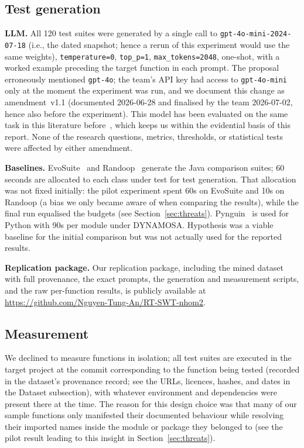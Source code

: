 \subsection{Test generation}
\textbf{LLM.} All 120 test suites were generated by a single call to
\texttt{gpt-4o-mini-2024-07-18} (i.e., the dated snapshot; hence a rerun of this
experiment would use the same weights), \texttt{temperature=0}, \texttt{top\_p=1},
\texttt{max\_tokens=2048}, one-shot, with a worked example preceding the target function
in each prompt. The proposal erroneously mentioned \texttt{gpt-4o}; the team's API key
had access to \texttt{gpt-4o-mini} only at the moment the experiment was run, and we
document this change as amendment~v1.1 (documented 2026-06-28 and finalised by the team
2026-07-02, hence also before the experiment). This model has been evaluated on the same
task in this literature before~\cite{konstantinou2026evaluating}, which keeps us within
the evidential basis of this report. None of the research questions, metrics, thresholds,
or statistical tests were affected by either amendment.

\textbf{Baselines.} EvoSuite~\cite{fraser2011evosuite} and
Randoop~\cite{pacheco2007randoop} generate the Java comparison suites; 60 seconds are
allocated to each class under test for test generation. That allocation was not fixed
initially: the pilot experiment spent 60s on EvoSuite and 10s on Randoop (a bias we only
became aware of when comparing the results), while the final run equalised the budgets
(see Section~\ref{sec:threats}). Pynguin~\cite{lukasczyk2022pynguin} is used for Python
with 90s per module under DYNAMOSA. Hypothesis was a viable baseline for the initial
comparison but was not actually used for the reported results.

\textbf{Replication package.} Our replication package, including the mined dataset with full
provenance, the exact prompts, the generation and measurement scripts, and the raw
per-function results, is publicly available at
\url{https://github.com/Nguyen-Tung-An/RT-SWT-nhom2}.

\subsection{Measurement}
We declined to measure functions in isolation; all test suites are executed in the target
project at the commit corresponding to the function being tested (recorded in the
dataset's provenance record; see the URLs, licences, hashes, and dates in the Dataset
subsection), with whatever environment and dependencies were present there at the time.
The reason for this design choice was that many of our sample functions only manifested
their documented behaviour while resolving their imported names inside the module or
package they belonged to (see the pilot result leading to this insight in
Section~\ref{sec:threats}).

